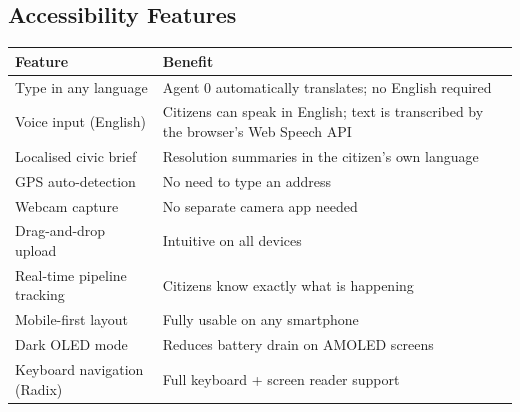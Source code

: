 \documentclass[11pt,a4paper]{article}
\newcommand{\thead}[1]{{\color{white}\bfseries\sffamily #1}}
\begin{document}
\subsection{Accessibility Features}

\begin{tabular}{@{} L{5.5cm} L{8.5cm} @{}}
\toprule
{}
\thead{Feature} & \thead{Benefit} \\
\midrule
Type in any language            & Agent 0 automatically translates; no English required \\
Voice input (English)           & Citizens can speak in English; text is transcribed by the browser's Web Speech API \\
Localised civic brief           & Resolution summaries in the citizen's own language \\
GPS auto-detection              & No need to type an address \\
Webcam capture                  & No separate camera app needed \\
Drag-and-drop upload            & Intuitive on all devices \\
Real-time pipeline tracking     & Citizens know exactly what is happening \\
Mobile-first layout             & Fully usable on any smartphone \\
Dark OLED mode                  & Reduces battery drain on AMOLED screens \\
Keyboard navigation (Radix)     & Full keyboard + screen reader support \\
\bottomrule
\end{tabular}
\end{document}
